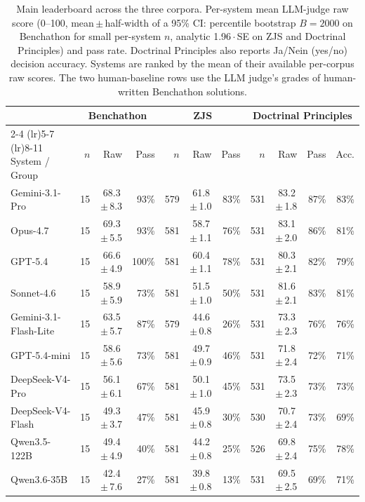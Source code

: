 \begin{table}[!t]
\centering\footnotesize
\caption{Main leaderboard across the three corpora. Per-system mean LLM-judge raw score (0--100, mean\,$\pm$\,half-width of a 95\% CI: percentile bootstrap $B=2000$ on Benchathon for small per-system $n$, analytic 1.96\,$\cdot$\,SE on ZJS and Doctrinal Principles) and pass rate. Doctrinal Principles also reports Ja/Nein (yes/no) decision accuracy. Systems are ranked by the mean of their available per-corpus raw scores. The two human-baseline rows use the LLM judge's grades of human-written Benchathon solutions.}
\label{tbl-main-leaderboard}
\setlength{\tabcolsep}{4pt}
\begin{tabular*}{\textwidth}{@{\extracolsep{\fill}} l rrr rrr rrrr @{}}
\toprule
 & \multicolumn{3}{c}{Benchathon} & \multicolumn{3}{c}{ZJS} & \multicolumn{4}{c}{Doctrinal Principles} \\
\cmidrule(lr){2-4} \cmidrule(lr){5-7} \cmidrule(lr){8-11}
System / Group & $n$ & Raw & Pass & $n$ & Raw & Pass & $n$ & Raw & Pass & Acc. \\
\midrule
Gemini-3.1-Pro & 15 & 68.3\,$\pm$\,8.3 & 93\% & 579 & 61.8\,$\pm$\,1.0 & 83\% & 531 & 83.2\,$\pm$\,1.8 & 87\% & 83\% \\
Opus-4.7 & 15 & 69.3\,$\pm$\,5.5 & 93\% & 581 & 58.7\,$\pm$\,1.1 & 76\% & 531 & 83.1\,$\pm$\,2.0 & 86\% & 81\% \\
GPT-5.4 & 15 & 66.6\,$\pm$\,4.9 & 100\% & 581 & 60.4\,$\pm$\,1.1 & 78\% & 531 & 80.3\,$\pm$\,2.1 & 82\% & 79\% \\
Sonnet-4.6 & 15 & 58.9\,$\pm$\,5.9 & 73\% & 581 & 51.5\,$\pm$\,1.0 & 50\% & 531 & 81.6\,$\pm$\,2.1 & 83\% & 81\% \\
Gemini-3.1-Flash-Lite & 15 & 63.5\,$\pm$\,5.7 & 87\% & 579 & 44.6\,$\pm$\,0.8 & 26\% & 531 & 73.3\,$\pm$\,2.3 & 76\% & 76\% \\
GPT-5.4-mini & 15 & 58.6\,$\pm$\,5.6 & 73\% & 581 & 49.7\,$\pm$\,0.9 & 46\% & 531 & 71.8\,$\pm$\,2.4 & 72\% & 71\% \\
DeepSeek-V4-Pro & 15 & 56.1\,$\pm$\,6.1 & 67\% & 581 & 50.1\,$\pm$\,1.0 & 45\% & 531 & 73.5\,$\pm$\,2.3 & 73\% & 73\% \\
DeepSeek-V4-Flash & 15 & 49.3\,$\pm$\,3.7 & 47\% & 581 & 45.9\,$\pm$\,0.8 & 30\% & 530 & 70.7\,$\pm$\,2.4 & 73\% & 69\% \\
Qwen3.5-122B & 15 & 49.4\,$\pm$\,4.9 & 40\% & 581 & 44.2\,$\pm$\,0.8 & 25\% & 526 & 69.8\,$\pm$\,2.4 & 75\% & 78\% \\
Qwen3.6-35B & 15 & 42.4\,$\pm$\,7.6 & 27\% & 581 & 39.8\,$\pm$\,0.8 & 13\% & 531 & 69.5\,$\pm$\,2.5 & 69\% & 71\% \\

\end{tabular*}
\end{table}
